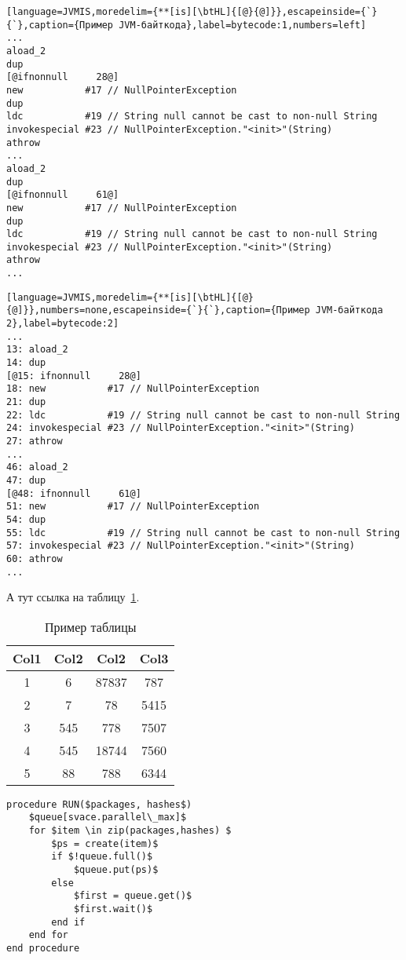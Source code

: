\begin{lstlisting}[language=JVMIS,moredelim={**[is][\btHL]{[@}{@]}},escapeinside={`}{`},caption={Пример JVM-байткода},label=bytecode:1,numbers=left]
...
aload_2
dup
[@ifnonnull     28@]
new           #17 // NullPointerException
dup
ldc           #19 // String null cannot be cast to non-null String
invokespecial #23 // NullPointerException."<init>"(String)
athrow
...
aload_2
dup
[@ifnonnull     61@]
new           #17 // NullPointerException
dup
ldc           #19 // String null cannot be cast to non-null String
invokespecial #23 // NullPointerException."<init>"(String)
athrow
...
\end{lstlisting}
\egroup

\begin{lstlisting}[language=JVMIS,moredelim={**[is][\btHL]{[@}{@]}},numbers=none,escapeinside={`}{`},caption={Пример JVM-байткода 2},label=bytecode:2]
...
13: aload_2
14: dup
[@15: ifnonnull     28@]
18: new           #17 // NullPointerException
21: dup
22: ldc           #19 // String null cannot be cast to non-null String
24: invokespecial #23 // NullPointerException."<init>"(String)
27: athrow
...
46: aload_2
47: dup
[@48: ifnonnull     61@]
51: new           #17 // NullPointerException
54: dup
55: ldc           #19 // String null cannot be cast to non-null String
57: invokespecial #23 // NullPointerException."<init>"(String)
60: athrow
...
\end{lstlisting}

А тут ссылка на таблицу~\ref{table:1}.

\begin{table}[h!]
\centering
\begin{tabular}{| c | c | c | c |} 
    \hline
    Col1 & Col2 & Col2 & Col3 \\ [0.5ex] 
    \hline
    1 & 6 & 87837 & 787 \\
    \hline
    2 & 7 & 78 & 5415 \\
    \hline
    3 & 545 & 778 & 7507 \\
    \hline
    4 & 545 & 18744 & 7560 \\
    \hline
    5 & 88 & 788 & 6344 \\
    \hline
\end{tabular}
\caption{Пример таблицы}
\label{table:1}
\end{table}

\begin{lstlisting}[style=algorithmic, caption={Привер псевдокода на алгоритмическом языке}]
procedure RUN($packages, hashes$)
    $queue[svace.parallel\_max]$
    for $item \in zip(packages,hashes) $
        $ps = create(item)$
        if $!queue.full()$
            $queue.put(ps)$
        else
            $first = queue.get()$
            $first.wait()$
        end if
    end for
end procedure
\end{lstlisting}

